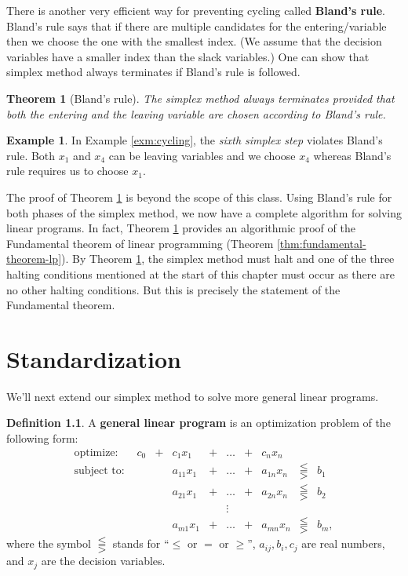 \documentclass[
]{book}
\newtheorem{theorem}{Theorem}[chapter]
\theoremstyle{definition}
\newtheorem{definition}{Definition}[chapter]
\theoremstyle{definition}
\newtheorem{example}{Example}[chapter]
\theoremstyle{definition}
\theoremstyle{definition}
\theoremstyle{remark}
\begin{document}
There is another very efficient way for preventing cycling called \textbf{Bland's rule}. Bland's rule
says that if there are multiple candidates for the entering/variable then we choose the one with the
smallest index. (We assume that the decision variables have a smaller index than the slack
variables.) One can show that simplex method always terminates if Bland's rule is followed.

\begin{theorem}[Bland's rule]
\protect\hypertarget{thm:blands-rule}{}\label{thm:blands-rule}The simplex method always terminates provided that both the entering and the leaving variable are
chosen according to Bland's rule.
\end{theorem}

\begin{example}
In Example \ref{exm:cycling}, the \emph{sixth simplex step} violates Bland's rule. Both
\(x_1\) and \(x_4\) can be leaving variables and we choose \(x_4\) whereas Bland's rule requires us to
choose \(x_1\).
\end{example}

The proof of Theorem \ref{thm:blands-rule} is beyond the scope of this class. Using Bland's rule
for both phases of the simplex method, we now have a complete algorithm for solving
linear programs. In fact, Theorem \ref{thm:blands-rule} provides an algorithmic proof of the
Fundamental theorem of linear programming (Theorem \ref{thm:fundamental-theorem-lp}). By Theorem
\ref{thm:blands-rule}, the simplex method must halt and one of the three halting conditions
mentioned at the start of this chapter must occur as there are no other halting conditions. But this
is precisely the statement of the Fundamental theorem.

\hypertarget{standardization}{%
\chapter{Standardization}\label{standardization}}

We'll next extend our simplex method to solve more general linear programs.

\begin{definition}
A \textbf{general linear program} is an optimization problem of the following form:
\begin{equation}
  \begin{array}{llllllllllllll}
    \mbox{optimize: } 
      & c_0 & + & c_1 x_1 & + & \dots & + & c_n x_n & \\
    \mbox{subject to: } 
      & & & a_{11} x_1 & + & \dots & + & a_{1n} x_n & \lesseqqgtr & b_1 \\
      & & & a_{21} x_1 & + & \dots & + & a_{2n} x_n & \lesseqqgtr & b_2 \\
      & & & & & \vdots &  \\
      & & & a_{m1} x_1 & + & \dots & + & a_{mn} x_n & \lesseqqgtr & b_m,
  \end{array}
  \label{eq:intro-lp}
\end{equation}
where the symbol \(\lesseqqgtr\) stands for ``\(\leq\) or \(=\) or \(\geq\)'', \(a_{ij}, b_i, c_j\) are real numbers, and \(x_j\) are the decision variables.
\end{definition}
\end{document}
